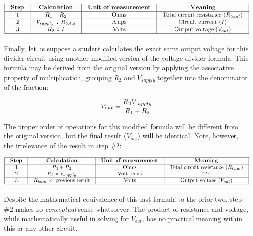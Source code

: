 
$$\vbox{\offinterlineskip
\halign{\strut
\vrule \quad\hfil # \ \hfil & 
\vrule \quad\hfil # \ \hfil & 
\vrule \quad\hfil # \ \hfil & 
\vrule \quad\hfil # \ \hfil \vrule \cr
\noalign{\hrule}
%
\textbf{Step} & \textbf{Calculation} & \textbf{Unit of measurement} & \textbf{Meaning} \cr
%
\noalign{\hrule}
%
1 & $R_1 + R_2$ & Ohms & Total circuit resistance ($R_{total}$) \cr
%
\noalign{\hrule}
%
2 & $V_{supply} \div R_{total}$ & Amps & Circuit current ($I$) \cr
%
\noalign{\hrule}
%
3 & $R_2 \times I$ & Volts & Output voltage ($V_{out}$) \cr
%
\noalign{\hrule}
} %
}$$ %

\vskip 10pt

Finally, let us suppose a student calculates the exact same output voltage for this divider circuit using another modified version of the voltage divider formula.  This formula may be derived from the original version by applying the associative property of multiplication, grouping $R_2$ and $V_{supply}$ together into the denominator of the fraction:

$$V_{out} = {R_2 V_{supply} \over R_1 + R_2}$$

The proper order of operations for this modified formula will be different from the original version, but the final result ($V_{out}$) will be identical.  Note, however, the irrelevance of the result in step \#2:


$$\vbox{\offinterlineskip
\halign{\strut
\vrule \quad\hfil # \ \hfil & 
\vrule \quad\hfil # \ \hfil & 
\vrule \quad\hfil # \ \hfil & 
\vrule \quad\hfil # \ \hfil \vrule \cr
\noalign{\hrule}
%
\textbf{Step} & \textbf{Calculation} & \textbf{Unit of measurement} & \textbf{Meaning} \cr
%
\noalign{\hrule}
%
1 & $R_1 + R_2$ & Ohms & Total circuit resistance ($R_{total}$) \cr
%
\noalign{\hrule}
%
2 & $R_2 \times V_{supply}$ & Volt-ohms & ??? \cr
%
\noalign{\hrule}
%
3 & $R_{total} \times \hbox{ previous result}$ & Volts & Output voltage ($V_{out}$) \cr
%
\noalign{\hrule}
} %
}$$ %

Despite the mathematical equivalence of this last formula to the prior two, step \#2 makes no \textit{conceptual} sense whatsoever.  The product of resistance and voltage, while mathematically useful in solving for $V_{out}$, has no practical meaning within this or any other circuit.  

